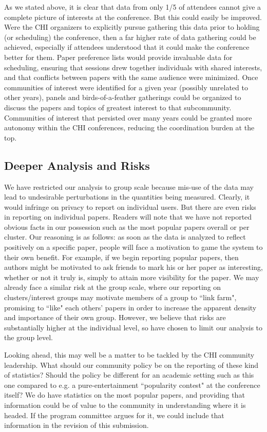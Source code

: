 \documentclass{sigchi}
\begin{document}
As we stated above, it is clear that data from only 1/5 of attendees cannot give a complete picture of interests at the conference.  But this could easily be improved.  Were the CHI organizers to explicitly pursue gathering this data prior to holding (or scheduling) the conference, then a far higher rate of data gathering could be achieved, especially if attendees understood that it could make the conference better for them.  Paper preference lists would provide invaluable data for scheduling, ensuring that sessions drew together individuals with shared interests, and that conflicts between papers with the same audience were minimized.  Once communities of interest were identified for a given year (possibly unrelated to other years), panels and birds-of-a-feather gatherings could be organized to discuss the papers and topics of greatest interest to that subcommunity.  Communities of interest that persisted over many years could be granted more autonomy within the CHI conferences, reducing the coordination burden at the top.  

\subsection{Deeper Analysis and Risks}
We have restricted our analysis to group scale because mis-use of the data may lead to undesirable perturbations in the quantities being measured. Clearly, it would infringe on privacy to report on individual users.  But there are even risks in reporting on individual papers. Readers will note that we have not reported obvious facts in our possession such as the most popular papers overall or per cluster. Our reasoning is as follows: as soon as the data is analyzed to reflect positively on a specific paper, people will face a motivation to game the system to their own benefit.  For example, if we begin reporting popular papers, then authors might be motivated to ask friends to mark his or her paper as interesting, whether or not it truly is, simply to attain more visibility for the paper.   We may already face a similar risk at the group scale, where our reporting on clusters/interest groups may motivate members of a group to ``link farm", promising to ``like" each others' papers in order to increase the apparent density and importance of their own group.  However, we believe that risks are substantially higher at the individual level, so have chosen to limit our analysis to the group level.

Looking ahead, this may well be a matter to be tackled by the CHI community leadership.  What should our community policy be on the reporting of these kind of statistics?  Should the policy be different for an academic setting such as this one compared to e.g. a pure-entertainment ``popularity contest" at the conference itself? We do have statistics on the most popular papers, and providing that information could be of value to the community in understanding where it is headed.  If the program committee argues for it, we could include that information in the revision of this submission.
\end{document}

